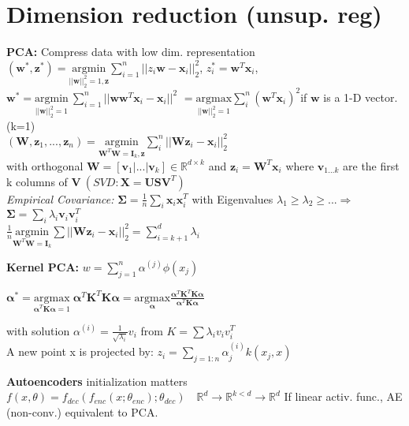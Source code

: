
\section{Dimension reduction (unsup. reg)}
    \textbf{PCA:} Compress data with low dim. representation\\
    $(\boldsymbol{w}^*,\boldsymbol{z}^*)={\underset{||\boldsymbol{w}||^2_2=1,\boldsymbol{z}}{\mathrm{argmin}}} \sum_{i=1}^n ||z_i\boldsymbol{w}-\boldsymbol{x}_i||^2_2 $, 
    $z_i^*=\boldsymbol{w}^T\boldsymbol{x}_i$, 
    $\boldsymbol{w}^*=\underset{||\boldsymbol{w}||^2_2=1}{\mathrm{argmin}}\ \sum_{i=1}^n ||\boldsymbol{ww}^T\boldsymbol{x}_i - \boldsymbol{x}_i||^2$
    $=\underset{||\boldsymbol{w}||^2_2=1}{\mathrm{argmax}} \sum_i^{n} (\boldsymbol{w}^T \boldsymbol{x}_i) ^2$\quad if $\boldsymbol{w}$ is a 1-D vector.(k=1)\\

    
    $(\boldsymbol{W},\boldsymbol{z}_1,...,\boldsymbol{z}_n)=\underset{\boldsymbol{W}^T\boldsymbol{W}=\boldsymbol{I}_k,\boldsymbol{z}}{\mathrm{argmin}} \sum_i^n ||\boldsymbol{Wz}_i-\boldsymbol{x}_i||^2_2 $\\
    with orthogonal $\boldsymbol{W} = [\boldsymbol{v}_1| ... | \boldsymbol{v}_k] \in \mathbb{R}^{d \times k}$ and $\boldsymbol{z}_i = \boldsymbol{W}^T\boldsymbol{x}_i$ where $\boldsymbol{v}_{1...k}$ are the first k columns of $\boldsymbol{V}\ (SVD: \boldsymbol{X}= \boldsymbol{USV}^T)$\\
    \textit{Empirical Covariance:} $\boldsymbol{\Sigma} = \frac{1}{n}\sum_i \boldsymbol{x}_i\boldsymbol{x}_i^T $
    \makebox[0.5cm][]{}with Eigenvalues $\lambda_1\geq \lambda_2 \geq ... \Rightarrow$ $\boldsymbol{\Sigma} = \sum_i \lambda_i \boldsymbol{v}_i\boldsymbol{v}_i^T$ \\
    $\frac{1}{n}\underset{\boldsymbol{W}^T\boldsymbol{W}=\boldsymbol{I}_k}{\mathrm{argmin}} \sum ||\boldsymbol{Wz}_i-\boldsymbol{x}_i||^2_2 = \sum_{i=k+1}^d \lambda_i$
    
    \textbf{Kernel PCA:} $w = \sum_{j=1}^n {\alpha}^{(j)} \phi(x_j)$\\
    \centerline{$\boldsymbol{\alpha}^*= \underset{\boldsymbol{\alpha}^T\boldsymbol{K\alpha}=1}{\mathrm{argmax}}\; \boldsymbol{\alpha}^T\boldsymbol{K}^T\boldsymbol{K}\boldsymbol{\alpha} = \underset{\boldsymbol{\alpha}}{\mathrm{argmax}} \frac{\boldsymbol{\alpha}^T\boldsymbol{K}^T\boldsymbol{K}\boldsymbol{\alpha}}{\boldsymbol{\alpha}^T\boldsymbol{K}\boldsymbol{\alpha}}$}
    with solution $\alpha^{(i)} = \frac{1}{\sqrt{\lambda_i}}v_i$ from $K=\sum \lambda_iv_iv_i^T$\\
    A new point x is projected by: $z_i = \sum_{j=1:n} \alpha_j^{(i)} k(x_j,x)$
    
    \textbf{Autoencoders} initialization matters\\ 
    $f(x,\theta)=f_{dec}(f_{enc}(x;\theta_{enc});\theta_{dec})\quad \mathbb{R}^{d}\to \mathbb{R}^{k<d} \to \mathbb{R}^{d}$
    If linear activ. func., AE (non-conv.) equivalent to PCA.